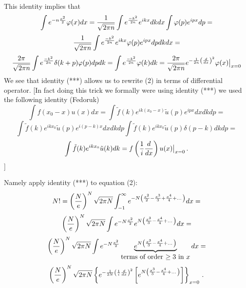 This identity implies that
     $$
\int e^{-n{x^2\over 2}}
      \varphi(x)dx=
{1\over \sqrt {2\pi n}}
\int e^{-k^2\over 2n}e^{ikx}dkdx
\int \varphi (p)e^{ipx}dp=
   $$
   $$
{1\over \sqrt {2\pi n}}
\int  e^{-k^2\over 2n}e^{ikx}\varphi (p)e^{ipx}dpdkdx=
     $$
        $$  
{2\pi \over \sqrt {2\pi n}}
\int e^{-k^2\over 2n}\delta (k+p)\varphi (p)dpdk
=\int e^{-k^2\over 2n}\varphi (k)dk=
{2\pi \over \sqrt {2\pi n}}
 e^{-{1\over 2n}\left({d\over
dx}\right)^2}\varphi(x)\big\vert_{x=0}
        $$
We see that identity (***) allows us to rewrite (2)
in terms of differential operator.
[In fact doing this trick we formally were using identity (***)
we used the following
identity (Fedoruk) 
      $$
\int f(x_0-x)u(x)dx=
\int \tilde f(k)
e^{ik(x_0-x)}
\tilde u(p)e^{ipx}dx dk dp=
  $$
  $$
\int \tilde f(k)
e^{ikx_0}
\tilde u(p)e^{i(p-k)x}dx dk dp
\int \tilde f(k)
e^{ikx_0}
\tilde u(p)\delta(p-k) dk dp=
  $$
  $$
\int \tilde f(k)
e^{ikx_0}
\tilde u(k) dk=
 f\left({1\over i}{d\over dx}\right)
      u(x)\big\vert_{x=0}\,.
     $$
]

Namely apply identity (***)  to equation (2):
 $$
N!=
\left(N\over e\right)^N\sqrt {2\pi N}
\int_{-1}^\infty e^{-N
   \left(
  {x^2\over 2 }
- {x^3\over 3 }
 +{x^4\over 4 }+\dots
   \right)}dx=
   $$
   $$
\left(N\over e\right)^N\sqrt {2\pi N}
\int e^{-N{x^2\over 2}}
     e^{
      N
     \left(
 {x^3\over 3 }
 -{x^4\over 4 }+\dots
     \right)
 }dx=
     $$
     $$
\left(N\over e\right)^N\sqrt {2\pi N}
\int e^{-N{x^2\over 2}}
\underbrace
  {
     e^{
      N
     \left(
 {x^3\over 3 }
 -{x^4\over 4 }+\dots
     \right)
 }
 }_{\hbox {terms of order $\geq 3$ in $x$}}
 dx=
  $$
  $$
\left(N\over e\right)^N\sqrt {2\pi N}
\left\{
 e^{-{1\over 2N}\left({1\over i}
 {d\over dx}\right)^2}
    \left[
     e^{
      N
     \left(
 {x^3\over 3 }
 -{x^4\over 4 }+\dots
     \right)
 } 
\right]
\right\}_{x=0}\,.
     $$

